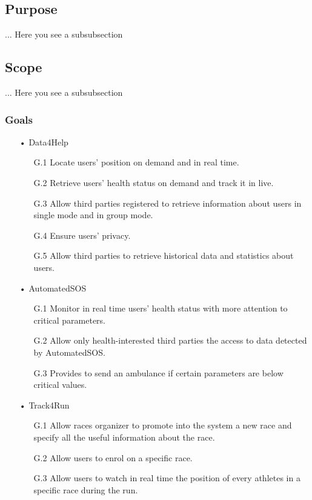 \subsection{Purpose}
... Here you see a subsubsection
\subsection{Scope}
... Here you see a subsubsection
\subsubsection{Goals}

\begin{enumerate}
\item[•] {\Large Data4Help}
	\begin{enumerate}
		\item [G.1] Locate users' position on demand and in real time.
		\item [G.2] Retrieve users’ health status on demand and track it in live.
		\item [G.3] Allow third parties registered to retrieve information about users in 				single mode and in group mode.
		\item [G.4] Ensure users' privacy.
		\item [G.5] Allow third parties to retrieve historical data and statistics about 				users.
	\end{enumerate}
	
\item[•] {\Large AutomatedSOS}
	\begin{enumerate}
		\item [G.1] Monitor in real time users’ health status with more attention to 					critical parameters.
		\item [G.2] Allow only health-interested third parties the access to data detected 				by AutomatedSOS.
		\item [G.3] Provides to send an ambulance if certain parameters are below critical 				values.
	\end{enumerate}
	
\item[•] {\Large Track4Run}	
	\begin{enumerate}
		\item [G.1] Allow races organizer to promote into the system a new race and specify 			all the useful information about the race.
		\item [G.2] Allow users to enrol on a specific race.
		\item [G.3] Allow users to watch in real time the position of every athletes in a 				specific race during the run.
	\end{enumerate}
\end{enumerate}

